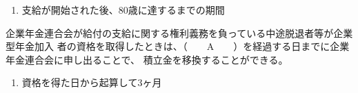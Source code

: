 \begin{answerbox}
  \begin{enumerate}[A: ]
    \item 支給が開始された後、80歳に達するまでの期間
  \end{enumerate}
\end{answerbox}

\begin{fillblank}[年金1 2018 問題1(5)\textcircled{3}]
企業年金連合会が給付の支給に関する権利義務を負っている中途脱退者等が企業型年金加入
者の資格を取得したときは、（　　A　　）を経過する日までに企業年金連合会に申し出ることで、
積立金を移換することができる。
\end{fillblank}

\begin{answerbox}
  \begin{enumerate}[A: ]
    \item 資格を得た日から起算して3ヶ月
  \end{enumerate}
\end{answerbox}

\newpage